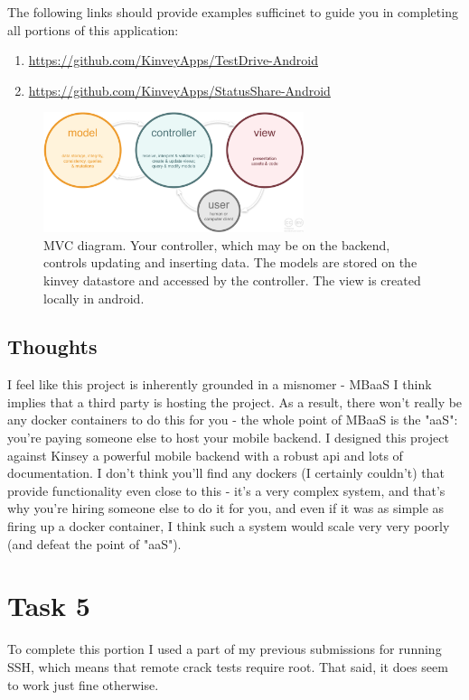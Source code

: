 \documentclass{article}
\begin{document}
The following links should provide examples sufficinet to guide you in completing all portions of this application:
\begin{enumerate}
\item \url{https://github.com/KinveyApps/TestDrive-Android}
\item \url{https://github.com/KinveyApps/StatusShare-Android}
\end{enumerate}

\begin{figure}[ht]
      \includegraphics[width=3in]{img/mvc.png}
      \centering
      \caption{MVC diagram. Your controller, which may be on the backend, controls updating and inserting data. The models are stored on the kinvey datastore and accessed by the controller. The view is created locally in android.}
\end{figure}

\subsection{Thoughts}
I feel like this project is inherently grounded in a misnomer - MBaaS I think implies that a third party is hosting the project. As a result, there won't really be any docker containers to do this for you - the whole point of MBaaS is the "aaS": you're paying someone else to host your mobile backend. I designed this project against Kinsey a powerful mobile backend with a robust api and lots of documentation. I don't think you'll find any dockers (I certainly couldn't) that provide functionality even close to this - it's a very complex system, and that's why you're hiring someone else to do it for you, and even if it was as simple as firing up a docker container, I think such a system would scale very very poorly (and defeat the point of "aaS").

\clearpage

\section{Task 5}
To complete this portion I used a part of my previous submissions for running SSH, which means that remote crack tests require root.
That said, it does seem to work just fine otherwise.
\end{document}
